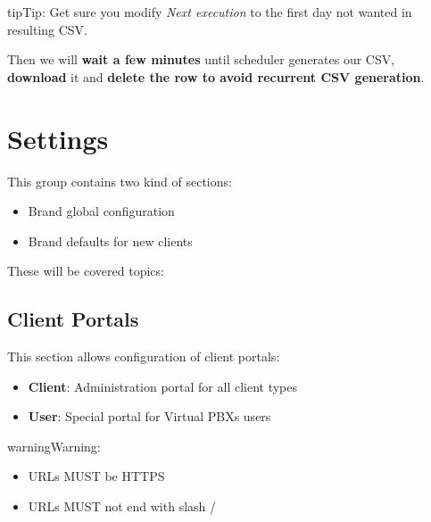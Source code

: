 \documentclass[letterpaper,10pt,english]{sphinxmanual}
\begin{document}
\begin{notice}{tip}{Tip:}
Get sure you modify \emph{Next execution} to the first day not wanted in resulting CSV.
\end{notice}

Then we will \textbf{wait a few minutes} until scheduler generates our CSV, \textbf{download} it and \textbf{delete the row to avoid recurrent
CSV generation}.


\section{Settings}
\label{administration_portal/brand/settings/index::doc}\label{administration_portal/brand/settings/index:settings}
This group contains two kind of sections:
\begin{itemize}
\item {} 
Brand global configuration

\item {} 
Brand defaults for new clients

\end{itemize}

These will be covered topics:
\label{administration_portal/brand/settings/client_portals:client-portals}

\subsection{Client Portals}
\label{administration_portal/brand/settings/client_portals:client-portals}\label{administration_portal/brand/settings/client_portals:id2}\label{administration_portal/brand/settings/client_portals::doc}\label{administration_portal/brand/settings/client_portals:id1}
This section allows configuration of client portals:
\begin{itemize}
\item {} 
\textbf{Client}: Administration portal for all client types

\item {} 
\textbf{User}: Special portal for Virtual PBXs users

\end{itemize}

\begin{notice}{warning}{Warning:}\begin{itemize}
\item {} 
URLs MUST be HTTPS

\item {} 
URLs MUST not end with slash /

\end{itemize}
\end{notice}
\end{document}

